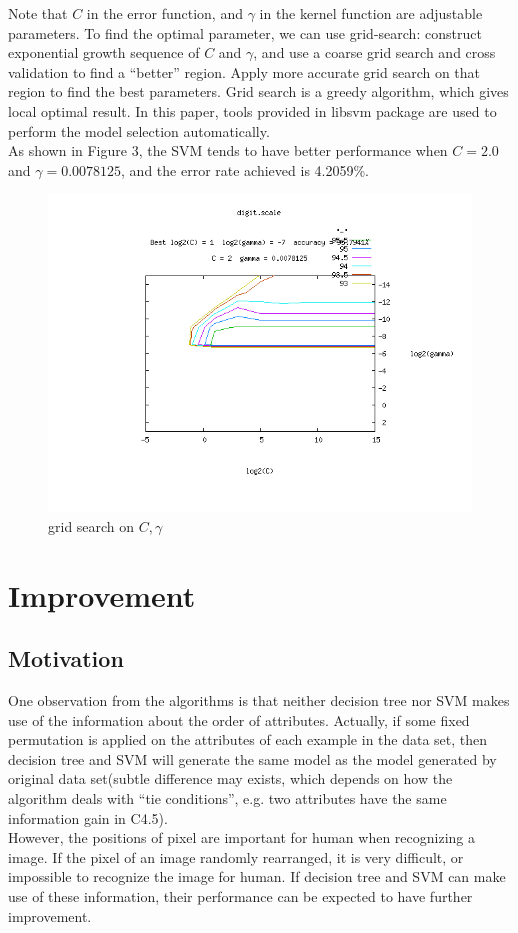 \documentclass[a4paper,11pt]{article}
\begin{document}
Note that $C$ in the error function, and $\gamma$ in the kernel function are adjustable parameters. To find the optimal parameter, we can use grid-search\cite{svm}: construct exponential growth sequence of $C$ and $\gamma$, and use a coarse grid search and cross validation to find a ``better'' region. Apply more accurate grid search on that region to find the best parameters. Grid search is a greedy algorithm, which gives local optimal result. In this paper, tools provided in libsvm\cite{libsvm} package are used to perform the model selection automatically.\\
As shown in Figure 3, the SVM tends to have better performance when $C=2.0$ and $\gamma=0.0078125$, and the error rate achieved is 4.2059\%.

\begin{figure}
\centering
\includegraphics[width=1.0\textwidth]{digit}
\caption{grid search on $C,\gamma$}
\end{figure}

\section{Improvement}
\subsection{Motivation}
One observation from the algorithms is that neither decision tree nor SVM makes use of the information about the order of attributes. Actually, if some fixed permutation is applied on the attributes of each example in the data set, then decision tree and SVM will generate the same model as the model generated by original data set(subtle difference may exists, which depends on how the algorithm deals with ``tie conditions'', e.g. two attributes have the same information gain in C4.5).\\
However, the positions of pixel are important for human when recognizing a image. If the pixel of an image randomly rearranged, it is very difficult, or impossible to recognize the image for human. If decision tree and SVM can make use of these information, their performance can be expected to have further improvement.\\
\end{document}
